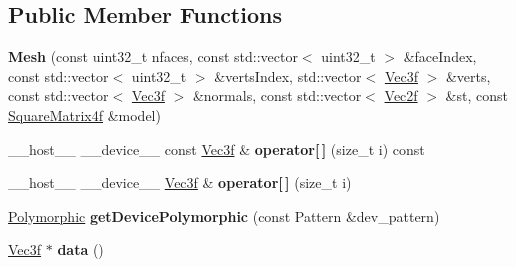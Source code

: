 \subsection*{Public Member Functions}
\begin{DoxyCompactItemize}
\item 
{\bfseries Mesh} (const uint32\+\_\+t nfaces, const std\+::vector$<$ uint32\+\_\+t $>$ \&face\+Index, const std\+::vector$<$ uint32\+\_\+t $>$ \&verts\+Index, std\+::vector$<$ \hyperlink{class_vec3}{Vec3f} $>$ \&verts, const std\+::vector$<$ \hyperlink{class_vec3}{Vec3f} $>$ \&normals, const std\+::vector$<$ \hyperlink{class_vec2}{Vec2f} $>$ \&st, const \hyperlink{class_square_matrix4}{Square\+Matrix4f} \&model)\hypertarget{class_mesh_ae66d189c5755899fc40c0a6f33a28781}{}\label{class_mesh_ae66d189c5755899fc40c0a6f33a28781}

\item 
\+\_\+\+\_\+host\+\_\+\+\_\+ \+\_\+\+\_\+device\+\_\+\+\_\+ const \hyperlink{class_vec3}{Vec3f} \& {\bfseries operator\mbox{[}$\,$\mbox{]}} (size\+\_\+t i) const\hypertarget{class_mesh_abe7a4a30b9a82dd71164071d0f398ab8}{}\label{class_mesh_abe7a4a30b9a82dd71164071d0f398ab8}

\item 
\+\_\+\+\_\+host\+\_\+\+\_\+ \+\_\+\+\_\+device\+\_\+\+\_\+ \hyperlink{class_vec3}{Vec3f} \& {\bfseries operator\mbox{[}$\,$\mbox{]}} (size\+\_\+t i)\hypertarget{class_mesh_ad97c062c97725555f13cec4c9c00448f}{}\label{class_mesh_ad97c062c97725555f13cec4c9c00448f}

\item 
\hyperlink{struct_polymorphic}{Polymorphic} {\bfseries get\+Device\+Polymorphic} (const Pattern \&dev\+\_\+pattern)\hypertarget{class_mesh_a5a6b65787f239cffc60fbf955473b129}{}\label{class_mesh_a5a6b65787f239cffc60fbf955473b129}

\item 
\hyperlink{class_vec3}{Vec3f} $\ast$ {\bfseries data} ()\hypertarget{class_mesh_a827769cc062165859fc51581e14d64d8}{}\label{class_mesh_a827769cc062165859fc51581e14d64d8}

\end{DoxyCompactItemize}

